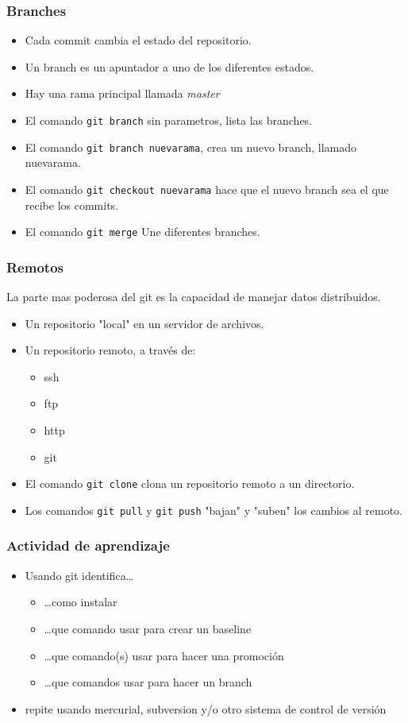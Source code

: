\begin{frame}
	\frametitle{Branches}
	\begin{itemize}
		\item Cada commit cambia el estado del repositorio.
		\item Un branch es un apuntador a uno de los diferentes estados. 
		\item Hay una rama principal llamada \emph{master}
		\item El comando \texttt{git branch} sin parametros, lista las branches.
		\item El comando \texttt{git branch nuevarama}, crea un nuevo branch, llamado nuevarama.
		\item El comando \texttt{git checkout nuevarama} hace que el nuevo branch sea el que recibe los commits. 
		\item El comando \texttt{git merge} Une diferentes branches. 
	\end{itemize}
\end{frame}
\begin{frame}
	\frametitle{Remotos}
	La parte mas poderosa del git es la capacidad de manejar datos distribuidos. \
	\begin{itemize}
		\item Un repositorio "local" en un servidor de archivos. 
		\item Un repositorio remoto, a trav\'es de:
			\begin{itemize}
				\item ssh
				\item ftp
				\item http
				\item git
			\end{itemize}
		\item El comando \texttt{git clone} clona un repositorio remoto a un directorio.
		\item Los comandos \texttt{git pull} y \texttt{git push} "bajan" y "suben" los cambios al remoto.
	\end{itemize}
\end{frame}

\begin{frame}
	\frametitle{Actividad de aprendizaje}
	\begin{itemize}
		\item{Usando git identifica\ldots}
			\begin{itemize}
				\item \ldots como instalar 
				\item \ldots que comando usar para crear un baseline
				\item \ldots que comando(s) usar para hacer una promoci\'on
				\item \ldots que comandos usar para hacer un branch
			\end{itemize}
		\item{repite usando mercurial, subversion y/o otro sistema de control de versi\'on}
	\end{itemize}
\end{frame}

